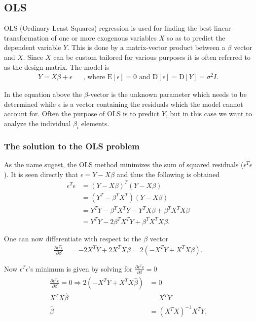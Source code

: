 \subsection{OLS}
OLS (Ordinary Least Squares) regression is used for finding the best linear transformation of one or more exogenous variables $X$ so as to predict the dependent variable $Y$. 
This is done by a matrix-vector product between a $\beta$ vector and $X$.
Since $X$ can be custom tailored for various purposes it is often referred to as the design matrix. The model is
\begin{align}
Y=X \beta +\epsilon && \text{, where } \mathrm{E}[\epsilon] = 0 \text{ and } \mathrm{D}[\epsilon] = \mathrm{D}[Y] = \sigma^2 I .
\end{align}

In the equation above the $\beta$-vector is the unknown parameter which needs to be determined while  $\epsilon$ is a vector containing the residuals which the model cannot account for.
Often the purpose of OLS is to predict $Y$, but in this case we want to analyze the individual $\beta_i$ elements.

\subsubsection{The solution to the OLS problem}
As the name sugest, the OLS method minimizes the sum of squared residuals ($\epsilon^T \epsilon$).
It is seen directly that $\epsilon = Y - X \beta$ and thus the following is obtained
\begin{equation}
\begin{split}
\epsilon^T\epsilon&=(Y-X\beta)^T (Y-X\beta)\\
&=(Y^T-\beta^T X^T) (Y-X\beta) \\
&=Y^T Y-\beta^T X^T Y-Y^T X \beta + \beta^T X^T X \beta \\
&=Y^T Y- 2\beta^T X^T Y+ \beta^T X^T X \beta.
\end{split}
\end{equation}

One can now differentiate with respect to the $\beta$ vector
\begin{equation}
\begin{split}
\frac{\partial \epsilon^T\epsilon}{\partial \beta}&=-2 X^T Y+2X^T X \beta=2(-X^T Y+X^T X \beta).
\end{split}
\end{equation}

Now  $\epsilon^T \epsilon$'s minimum is given by solving for $\frac{\partial \epsilon^T\epsilon}{\partial \beta} = 0$
\begin{equation}
\begin{split}
\frac{\partial \epsilon^T\epsilon}{\partial \beta} = 0 \Rightarrow 2(-X^T Y+X^T X \hat{\beta}) &= 0 \\
X^T X \hat{\beta}&=X^T Y \\
\hat{\beta}&=(X^T X)^{-1} X^T Y.
\end{split}
\end{equation}

